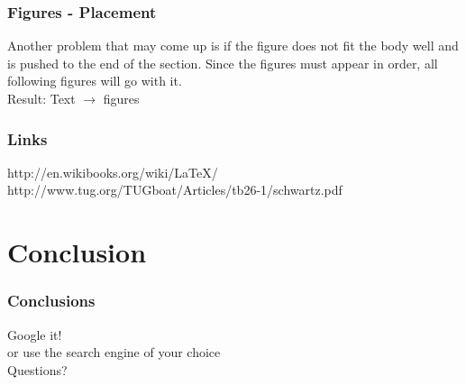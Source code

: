 \documentclass{beamer}
\begin{document}
\begin{frame}
\frametitle{Figures - Placement}
Another problem that may come up is if the figure does not fit the body well and is pushed to the end of the section.  Since the figures must appear in order, all following figures will go with it.  \\
\vspace{1cm}
Result: Text $\rightarrow$ figures
\end{frame}

\begin{frame}
\frametitle{Links}
http://en.wikibooks.org/wiki/LaTeX/ \\
http://www.tug.org/TUGboat/Articles/tb26-1/schwartz.pdf\\

\end{frame}

\section{Conclusion}
\begin{frame}
\begin{center}
\frametitle{Conclusions}
\Huge Google it!\\
\tiny or use the search engine of your choice\\
\vspace{1cm}
\huge Questions?
\end{center}
\end{frame}
\end{document}
